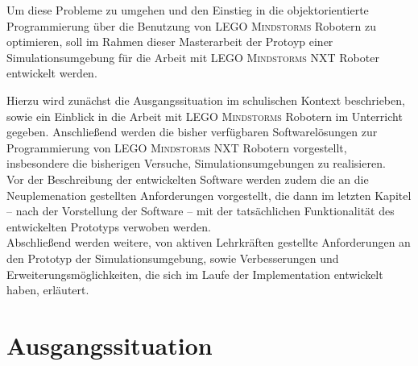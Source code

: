 \documentclass[paper=a4, DIV=calc, BCOR=15mm, twoside=on, onecolumn=on, open = right, titlepage =on, parskip =half, headsepline = on, footsepline = on, chapterprefix = off, appendixprefix = off, fontsize = 12pt, numbers = noenddot, abstract = on]{scrbook}
\begin{document}
Um diese Probleme zu umgehen und den Einstieg in die objektorientierte Programmierung über die Benutzung von \textsc{LEGO Mindstorms} Robotern zu optimieren, soll im Rahmen dieser Masterarbeit der Protoyp einer Simulationsumgebung für die Arbeit mit \textsc{LEGO Mindstorms} NXT Roboter entwickelt werden.

Hierzu wird zunächst die Ausgangssituation im schulischen Kontext beschrieben, sowie ein Einblick in die Arbeit mit \textsc{LEGO Mindstorms} Robotern im Unterricht gegeben. Anschließend werden die bisher verfügbaren Softwarelösungen zur Programmierung von \textsc{LEGO Mindstorms} NXT Robotern vorgestellt, insbesondere die bisherigen Versuche, Simulationsumgebungen zu realisieren.\\
Vor der Beschreibung der entwickelten Software werden zudem die an die Neuplemenation gestellten Anforderungen vorgestellt, die dann im letzten Kapitel -- nach der Vorstellung der Software -- mit der tatsächlichen Funktionalität des entwickelten Prototyps verwoben werden.\\
Abschließend werden weitere, von aktiven Lehrkräften gestellte Anforderungen an den Prototyp der Simulationsumgebung, sowie Verbesserungen und Erweiterungsmöglichkeiten, die sich im Laufe der Implementation entwickelt haben, erläutert.
\newpage
\par\singlespacing
\chapter{Ausgangssituation}

\par\singlespacing
\end{document}
